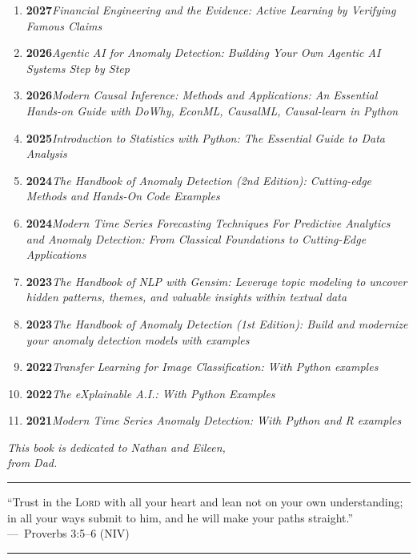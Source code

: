 \begin{enumerate}[label=\arabic*., leftmargin=*, itemsep=1pt, topsep=4pt]
  \item \textbf{2027}\quad\textit{Financial Engineering and the Evidence: Active Learning by Verifying Famous Claims}
  \item \textbf{2026}\quad\textit{Agentic AI for Anomaly Detection: Building Your Own Agentic AI Systems Step by Step}
  \item \textbf{2026}\quad\textit{Modern Causal Inference: Methods and Applications: An Essential Hands-on Guide with DoWhy, EconML, CausalML, Causal-learn in Python}
  \item \textbf{2025}\quad\textit{Introduction to Statistics with Python: The Essential Guide to Data Analysis}
  \item \textbf{2024}\quad\textit{The Handbook of Anomaly Detection (2nd Edition): Cutting-edge Methods and Hands-On Code Examples}
  \item \textbf{2024}\quad\textit{Modern Time Series Forecasting Techniques For Predictive Analytics and Anomaly Detection: From Classical Foundations to Cutting-Edge Applications}
  \item \textbf{2023}\quad\textit{The Handbook of NLP with Gensim: Leverage topic modeling to uncover hidden patterns, themes, and valuable insights within textual data}
  \item \textbf{2023}\quad\textit{The Handbook of Anomaly Detection (1st Edition): Build and modernize your anomaly detection models with examples}
  \item \textbf{2022}\quad\textit{Transfer Learning for Image Classification: With Python examples}
  \item \textbf{2022}\quad\textit{The eXplainable A.I.: With Python Examples}
  \item \textbf{2021}\quad\textit{Modern Time Series Anomaly Detection: With Python and R examples}
\end{enumerate}

\cleardoublepage
\thispagestyle{empty}
\vspace*{\fill}

\begin{center}
  \textit{This book is dedicated to Nathan and Eileen,}\\[4pt]
  \textit{from Dad.}
\end{center}

\vspace{2cm}

\noindent\rule{\textwidth}{0.8pt}
\begin{center}
  \begin{minipage}{0.85\textwidth}
    \centering
    ``Trust in the \textsc{Lord} with all your heart and lean not on your own
    understanding; in all your ways submit to him, and he will make your
    paths straight.''\\[6pt]
    ---~Proverbs 3:5--6 (NIV)
  \end{minipage}
\end{center}
\noindent\rule{\textwidth}{0.8pt}

\vspace*{\fill}